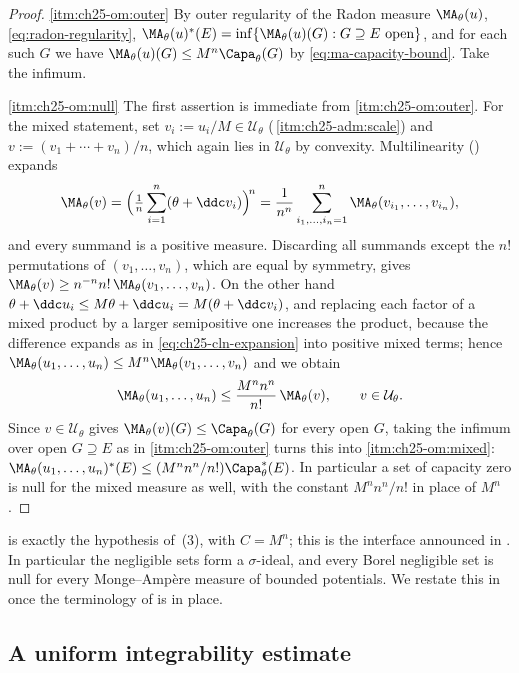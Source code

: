 \begin{proof}
\cref{itm:ch25-om:outer}  By outer regularity of the Radon measure
$\MA_\theta(u)$, \eqref{eq:radon-regularity},
$\MA_\theta(u)^*(E)=\inf\{\MA_\theta(u)(G):G\supseteq E\ \text{open}\}$,
and for each such $G$ we have
$\MA_\theta(u)(G)\leq M^n\Capa_\theta(G)$ by
\eqref{eq:ma-capacity-bound}.  Take the infimum.

\cref{itm:ch25-om:null}  The first assertion is immediate from
\cref{itm:ch25-om:outer}.  For the mixed statement, set
$v_i:=u_i/M\in\mathcal U_\theta$
(\,\cref{itm:ch25-adm:scale}) and
$v:=(v_1+\cdots+v_n)/n$, which again lies in $\mathcal U_\theta$ by
convexity.  Multilinearity () expands
\[
 \MA_\theta(v)=\Bigl(\tfrac1n\sum_{i=1}^n(\theta+\ddc v_i)\Bigr)^{\!n}
 =\frac1{n^n}\sum_{i_1,\ldots,i_n=1}^n
    \MA_\theta(v_{i_1},\ldots,v_{i_n}),
\]
and every summand is a positive measure.  Discarding all summands except the
$n!$ permutations of $(v_1,\ldots,v_n)$, which are equal by symmetry,
gives $\MA_\theta(v)\geq n^{-n}n!\,\MA_\theta(v_1,\ldots,v_n)$.  On the
other hand $\theta+\ddc u_i\leq M\theta+\ddc u_i=M(\theta+\ddc v_i)$, and
replacing each factor of a mixed product by a larger semipositive one
increases the product, because the difference expands as in
\eqref{eq:ch25-cln-expansion} into positive mixed terms; hence
$\MA_\theta(u_1,\ldots,u_n)\leq M^n\MA_\theta(v_1,\ldots,v_n)$ and we
obtain
\[
 \MA_\theta(u_1,\ldots,u_n)
 \leq\frac{M^nn^n}{n!}\,\MA_\theta(v),
 \qquad v\in\mathcal U_\theta .
\]
Since $v\in\mathcal U_\theta$ gives $\MA_\theta(v)(G)\leq\Capa_\theta(G)$
for every open $G$, taking the infimum over open $G\supseteq E$ as in
\cref{itm:ch25-om:outer} turns this into
\cref{itm:ch25-om:mixed}:
$\MA_\theta(u_1,\ldots,u_n)^*(E)\leq(M^nn^n/n!)\Capa^*_\theta(E)$.  In
particular a set of capacity zero is null for the mixed measure as well,
with the constant $M^nn^n/n!$ in place of $M^n$.
\end{proof}

 is exactly the hypothesis of
\,(3), with $C=M^n$; this is the interface
announced in .  In particular the negligible
sets form a $\sigma$-ideal, and every Borel negligible set is null for
every Monge--Amp\`ere measure of bounded potentials.  We restate this in
 once the terminology of
 is in place.

\subsection{A uniform integrability estimate}
\label{sec:ch25-uniform-integrability}

